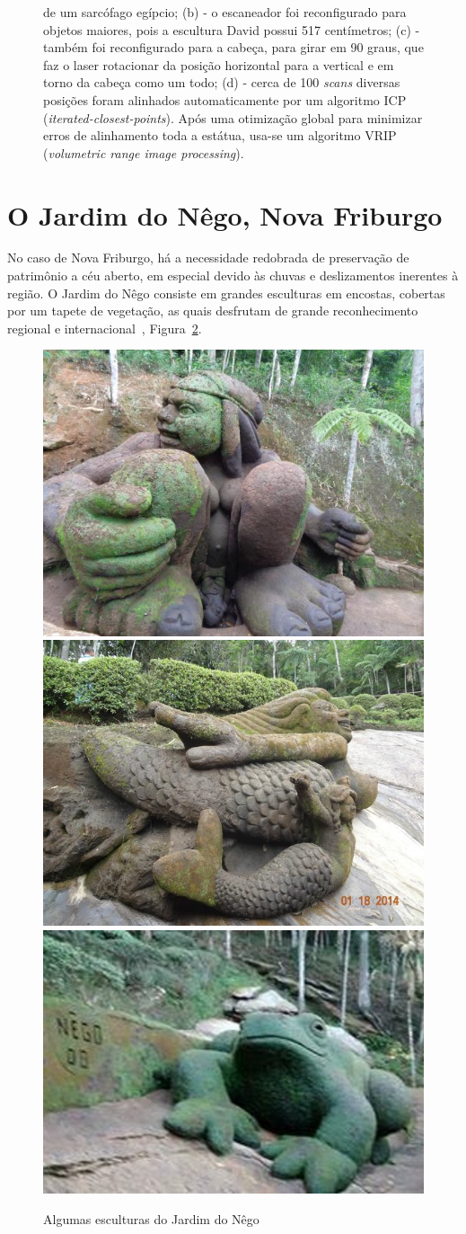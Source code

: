 \begin{figure}[!h]
{   de um sarcófago egípcio; (b) - o escaneador foi reconfigurado para objetos maiores, pois 
   a escultura David possui 517 centímetros; (c) - também foi reconfigurado para a cabeça,  
   para girar em 90 graus, que faz o laser
   rotacionar da posição horizontal para a vertical e em torno da
   cabeça como um todo; (d) - cerca de 100 \emph{scans}
   diversas posições foram alinhados automaticamente por um algoritmo 
   ICP (\emph{iterated-closest-points}). Após uma otimização global para minimizar erros 
   de alinhamento toda a estátua, usa-se um algoritmo VRIP (\emph {volumetric
   range image processing})}.
  \label{fig:david}
\end{figure}

\section*{O Jardim do Nêgo, Nova Friburgo}
No caso de Nova Friburgo, há a necessidade redobrada de preservação de
patrimônio a céu aberto, em especial devido às chuvas e deslizamentos inerentes à região.  O
Jardim do Nêgo consiste em grandes esculturas em encostas, cobertas por um tapete de
vegetação, as quais desfrutam de grande reconhecimento regional e internacional~\cite{JardimDoNego:TheGuardian},
Figura~\ref{fig:esculturas}.

\begin{figure} [!h]
	\centering
  \caption{Algumas esculturas do Jardim do Nêgo}
	\includegraphics[height=0.23\linewidth]{figs/jardim-do-nego.jpg}
	\includegraphics[height=0.23\linewidth]{figs/jardim-do-nego22.jpg}
	\includegraphics[height=0.23\linewidth]{figs/jardim-do-nego32-small.jpg}
  \label{fig:esculturas}
\end{figure}


